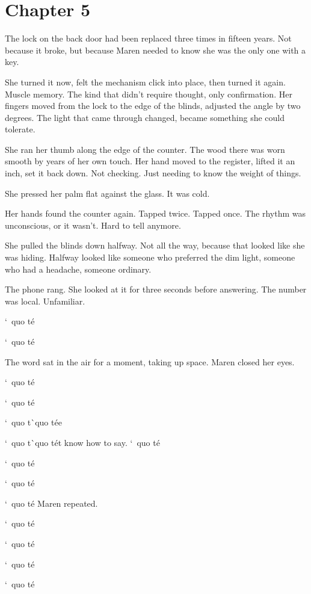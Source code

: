 \documentclass[12pt,letterpaper,openany]{book}
\begin{document}
\chapter{Chapter 5}
The lock on the back door had been replaced three times in fifteen years. Not because it broke, but because Maren needed to know she was the only one with a key.
\par
She turned it now, felt the mechanism click into place, then turned it again. Muscle memory. The kind that didn't require thought, only confirmation. Her fingers moved from the lock to the edge of the blinds, adjusted the angle by two degrees. The light that came through changed, became something she could tolerate.
\par
She ran her thumb along the edge of the counter. The wood there was worn smooth by years of her own touch. Her hand moved to the register, lifted it an inch, set it back down. Not checking. Just needing to know the weight of things.
\par
She pressed her palm flat against the glass. It was cold. 
\par
Her hands found the counter again. Tapped twice. Tapped once. The rhythm was unconscious, or it wasn't. Hard to tell anymore.
\par
She pulled the blinds down halfway. Not all the way, because that looked like she was hiding. Halfway looked like someone who preferred the dim light, someone who had a headache, someone ordinary.
\par
The phone rang. She looked at it for three seconds before answering. The number was local. Unfamiliar.
\par
`\ quo t\'e{}
\par
`\ quo t\'e{}
\par
The word sat in the air for a moment, taking up space. Maren closed her eyes.
\par
`\ quo t\'e{}
\par
`\ quo t\'e{}
\par
`\ quo t\`\ quo t\'e{}e{}
\par
`\ quo t\`\ quo t\'e{}t know how to say. `\ quo t\'e{}
\par
`\ quo t\'e{}
\par
`\ quo t\'e{}
\par
`\ quo t\'e{} Maren repeated.
\par
`\ quo t\'e{}
\par
 `\ quo t\'e{}
\par
`\ quo t\'e{}
\par
`\ quo t\'e{}
\end{document}
